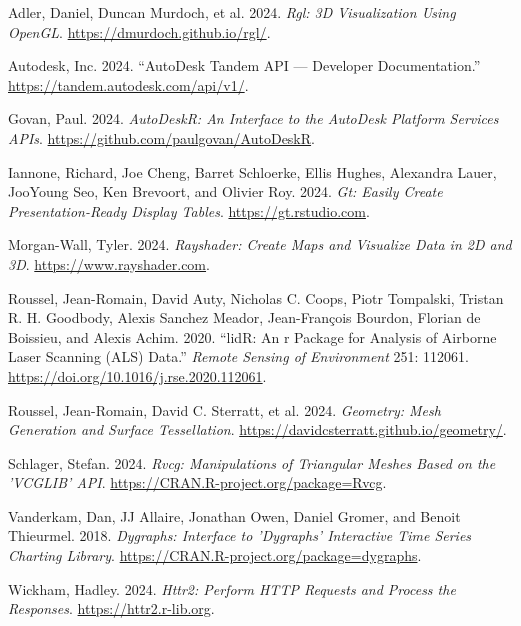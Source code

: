 \documentclass[
  11pt,
  letterpaper,
  DIV=11,
  numbers=noendperiod]{scrreprt}
\newlength{\cslhangindent}
\newenvironment{CSLReferences}[2] %
 {\begin{list}{}{%
  \setlength{\itemindent}{0pt}
  \setlength{\leftmargin}{0pt}
  \setlength{\parsep}{0pt}
  \ifodd #1
   \setlength{\leftmargin}{\cslhangindent}
   \setlength{\itemindent}{-1\cslhangindent}
  \fi
  \setlength{\itemsep}{#2\baselineskip}}}
 {\end{list}}
\begin{document}
\label{refs}
\begin{CSLReferences}{1}{0}
Adler, Daniel, Duncan Murdoch, et al. 2024. \emph{Rgl: 3D Visualization
Using OpenGL}. \url{https://dmurdoch.github.io/rgl/}.

Autodesk, Inc. 2024. {``AutoDesk Tandem API --- Developer
Documentation.''} \url{https://tandem.autodesk.com/api/v1/}.

Govan, Paul. 2024. \emph{AutoDeskR: An Interface to the AutoDesk
Platform Services APIs}. \url{https://github.com/paulgovan/AutoDeskR}.

Iannone, Richard, Joe Cheng, Barret Schloerke, Ellis Hughes, Alexandra
Lauer, JooYoung Seo, Ken Brevoort, and Olivier Roy. 2024. \emph{Gt:
Easily Create Presentation-Ready Display Tables}.
\url{https://gt.rstudio.com}.

Morgan-Wall, Tyler. 2024. \emph{Rayshader: Create Maps and Visualize
Data in 2D and 3D}. \url{https://www.rayshader.com}.

Roussel, Jean-Romain, David Auty, Nicholas C. Coops, Piotr Tompalski,
Tristan R. H. Goodbody, Alexis Sanchez Meador, Jean-François Bourdon,
Florian de Boissieu, and Alexis Achim. 2020. {``lidR: An r Package for
Analysis of Airborne Laser Scanning (ALS) Data.''} \emph{Remote Sensing
of Environment} 251: 112061.
\url{https://doi.org/10.1016/j.rse.2020.112061}.

Roussel, Jean-Romain, David C. Sterratt, et al. 2024. \emph{Geometry:
Mesh Generation and Surface Tessellation}.
\url{https://davidcsterratt.github.io/geometry/}.

Schlager, Stefan. 2024. \emph{Rvcg: Manipulations of Triangular Meshes
Based on the 'VCGLIB' API}.
\url{https://CRAN.R-project.org/package=Rvcg}.

Vanderkam, Dan, JJ Allaire, Jonathan Owen, Daniel Gromer, and Benoit
Thieurmel. 2018. \emph{Dygraphs: Interface to 'Dygraphs' Interactive
Time Series Charting Library}.
\url{https://CRAN.R-project.org/package=dygraphs}.

Wickham, Hadley. 2024. \emph{Httr2: Perform HTTP Requests and Process
the Responses}. \url{https://httr2.r-lib.org}.

\end{CSLReferences}
\end{document}
